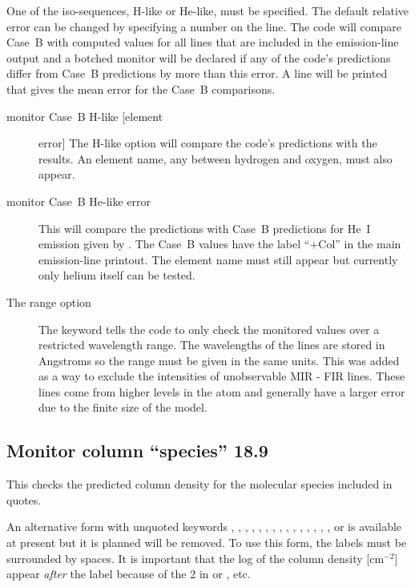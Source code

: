 One of the iso-sequences, H-like or He-like, must be specified.
The default
relative error can be changed by specifying a number on the line.
The code
will compare Case~B with computed values for all lines that are included
in the emission-line output
and a botched monitor will be declared if any
of the code's predictions differ from Case~B predictions by more than this
error.
A line will be printed that gives the mean error for the Case~B
comparisons.
\begin{description}
\item[monitor Case~B H-like [element] error]  The H-like option will compare
the code's predictions with the \citet{Storey1995} results.  An element
name, any between hydrogen and oxygen, must also appear.

\item[monitor Case~B He-like error]  This will compare the predictions with Case~B predictions for He~I emission given by 
\citet{Porter.R12Improved-He-I-emissivities-in-the-case-B-approximation, Porter.R13-CaseB-erratum}.  
The Case~B values have the label ``+Col'' in the main emission-line printout. The
element name must still appear but currently only helium itself can be
tested.

\item[The range option]  The keyword 
tells the code to only check the
monitored values over a restricted wavelength range.
The wavelengths of
the lines are stored in Angstroms so the range must be given in
the same units.
This was added as a way to exclude the intensities of
unobservable MIR - FIR lines.  These lines come from higher levels in the
atom and generally have a larger error due to the finite size of the model.
\end{description}

\subsection{Monitor column ``species'' 18.9}

This checks the predicted column density for the molecular species
included in quotes.

An alternative form with unquoted keywords ,
, , , ,
, , , ,
, , , ,
, , or  is available at
present but it is planned will be removed.  To use this form, the
labels must be surrounded by spaces.  It is important that the log of
the column density [cm$^{-2}$] appear \emph{after} the label because
of the 2 in  or , etc.

